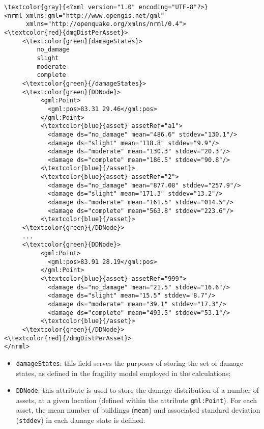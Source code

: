 \begin{Verbatim}[frame=single, commandchars=\\\{\}, samepage=false]
\textcolor{gray}{<?xml version="1.0" encoding="UTF-8"?>}
<nrml xmlns:gml="http://www.opengis.net/gml"
      xmlns="http://openquake.org/xmlns/nrml/0.4">
<\textcolor{red}{dmgDistPerAsset}>
     <\textcolor{green}{damageStates}> 
         no_damage 
         slight 
         moderate 
         complete
     <\textcolor{green}{/damageStates}>
     <\textcolor{green}{DDNode}>
          <gml:Point>
            <gml:pos>83.31 29.46</gml:pos>
          </gml:Point>
          <\textcolor{blue}{asset} assetRef="a1">
            <damage ds="no_damage" mean="486.6" stddev="130.1"/>
            <damage ds="slight" mean="118.8" stddev="9.9"/>
            <damage ds="moderate" mean="130.3" stddev="20.3"/>
            <damage ds="complete" mean="186.5" stddev="90.8"/>
          <\textcolor{blue}{/asset}>
          <\textcolor{blue}{asset} assetRef="2">
            <damage ds="no_damage" mean="877.08" stddev="257.9"/>
            <damage ds="slight" mean="171.3" stddev="13.2"/>
            <damage ds="moderate" mean="161.5" stddev="014.5"/>
            <damage ds="complete" mean="563.8" stddev="223.6"/>
          <\textcolor{blue}{/asset}>
     <\textcolor{green}{/DDNode}>
     ...
     <\textcolor{green}{DDNode}>
          <gml:Point>
            <gml:pos>83.91 28.19</gml:pos>
          </gml:Point>
          <\textcolor{blue}{asset} assetRef="999">
            <damage ds="no_damage" mean="21.5" stddev="16.6"/>
            <damage ds="slight" mean="15.5" stddev="8.7"/>
            <damage ds="moderate" mean="39.1" stddev="17.3"/>
            <damage ds="complete" mean="493.5" stddev="53.1"/>
          <\textcolor{blue}{/asset}>
     <\textcolor{green}{/DDNode}>
<\textcolor{red}{/dmgDistPerAsset}>
</nrml>
\end{Verbatim}

\begin{itemize}
\item  \Verb+damageStates+: this field serves the purposes of storing the set of damage states, as defined in the fragility model employed in the calculations;
\item  \Verb+DDNode+: this attribute is used to store the damage distribution of a number of assets, at a given location (defined within the attribute \Verb+gml:Point+). For each asset, the mean number of buildings (\Verb+mean+) and associated standard deviation (\Verb+stddev+) in each damage state is defined. 
\end{itemize}

